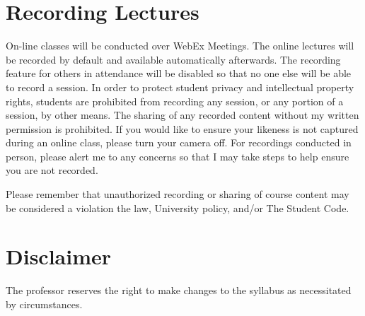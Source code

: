 \documentclass{article}
\begin{document}
\section*{Recording Lectures}
On-line classes will be conducted over WebEx Meetings. The online
lectures will be recorded by default and available automatically
afterwards. The recording feature for others in attendance will be
disabled so that no one else will be able to record a session. In
order to protect student privacy and intellectual property rights,
students are prohibited from recording any session, or any portion of
a session, by other means. The sharing of any
recorded content without my written permission is prohibited. If you
would like to ensure your likeness is not captured during an online
class, please turn your camera off. For recordings conducted in
person, please alert me to any concerns so that I may take steps to
help ensure you are not recorded.

Please remember that unauthorized recording or sharing of course
content may be considered a violation the law, University policy,
and/or The Student Code.

\section*{Disclaimer}
The professor reserves the right to make changes to the syllabus as
necessitated by circumstances.


\end{document}
